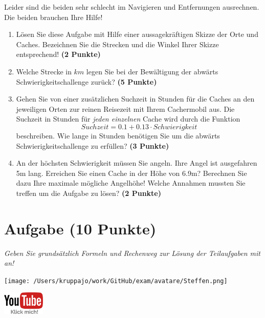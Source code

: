\documentclass[a4paper, 9pt]{scrartcl}\usepackage[]{graphicx}\usepackage[]{xcolor}
\begin{document}
Leider sind die beiden sehr schlecht im Navigieren und Entfernungen ausrechnen. Die beiden brauchen Ihre Hilfe!
  
\begin{enumerate}
\item Lösen Sie diese Aufgabe mit Hilfe einer aussagekräftigen Skizze der Orte und Caches. Bezeichnen Sie die Strecken und die Winkel Ihrer Skizze entsprechend! \textbf{(2 Punkte)}
\item Welche Strecke in $km$ legen Sie bei der Bewältigung der abwärts Schwierigkeitschallenge zurück? \textbf{(5    Punkte)}
\item Gehen Sie von einer zusätzlichen Suchzeit in Stunden für die Caches an den jeweiligen Orten zur reinen Reisezeit mit Ihrem Cachermobil aus. Die Suchzeit in Stunden für \textit{jeden einzelnen} Cache wird durch die Funktion  
  \begin{equation*}
    Suchzeit = 0.1 + 0.13 \cdot Schwierigkeit
  \end{equation*}  
  beschreiben.  Wie lange in Stunden benötigen Sie um die abwärts Schwierigkeitschallenge zu erfüllen? \textbf{(3 Punkte)}
\item An der höchsten Schwierigkeit müssen Sie angeln. Ihre Angel ist ausgefahren 5m lang. Erreichen Sie einen Cache in der Höhe von 6.9m?  Berechnen Sie dazu Ihre maximale mögliche Angelhöhe! Welche Annahmen mussten Sie treffen um die Aufgabe zu lösen? \textbf{(2 Punkte)} 
\end{enumerate}

 
\clearpage

\section{Aufgabe \hfill (10 Punkte)}

\textit{Geben Sie grundsätzlich Formeln und Rechenweg zur Lösung der Teilaufgaben mit an!} \\[1Ex]
 

 
\begin{minipage}[t]{0.5\textwidth}
\texttt{[image: /Users/kruppajo/work/GitHub/exam/avatare/Steffen.png]}
\end{minipage}
\begin{minipage}[t]{0.5\textwidth}
\hfill
\href{https://youtu.be/4-dSaPMhK9s}{\includegraphics[width = 2cm]{img/youtube}}
\end{minipage}
\end{document}
